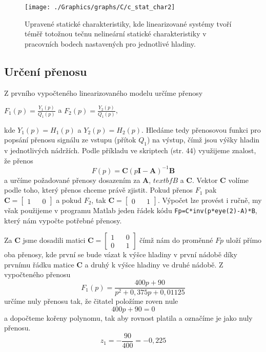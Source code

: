 \documentclass{article}
\begin{document}
			\begin{figure}[H]
				\centering
				\texttt{[image: ./Graphics/graphs/C/c\_stat\_char2]}
				\caption{Upravené statické charakteristiky, kde linearizované systémy tvoří téměř totožnou tečnu nelineární statické charakteristiky v pracovních bodech nastavených pro jednotlivé hladiny.}
				\label{pic:c_stat_char2}
			\end{figure}
				
			
		\subsection{Určení přenosu}
			Z prvního vypočteného linearizovaného modelu určíme přenosy
				\begin{center}
					$ F_{1}(p)=\frac{Y_{1}(p)}{Q_{1}(p)} $ \hspace{1cm} a \hspace{1cm} $ F_{2}(p)=\frac{Y_{2}(p)}{Q_{1}(p)} $,
				\end{center}
			kde \(Y_{1}(p) = H_{1}(p)\) a \(Y_{2}(p) = H_{2}(p)\). Hledáme tedy přenosovou funkci pro popsání přenosu signálu ze vstupu (přítok \(Q_{1}\)) na výstup, čímž jsou výšky hladin v jednotlivých nádržích.
			Podle příkladu ve skriptech (str. 44) využijeme znalost, že přenos 
			\[F(p)=\textbf{C}(p \textbf{I}-\textbf{A})^{-1}\textbf{B}\]
			a určíme požadované přenosy dosazením za \(\textbf{A}\), \(textbf{B}\) a \(\textbf{C}\). Vektor \(\textbf{C}\) volíme podle toho, který přenos chceme právě zjistit. Pokud přenos \(F_{1}\) pak \(\textbf{C}=\begin{bmatrix}1&&0\end{bmatrix}\) a pokud \(F_{2}\), tak \(\textbf{C}=\begin{bmatrix}0&&1\end{bmatrix}\). Výpočet lze provést i ručně, my však použijeme v programu Matlab jeden řádek kódu \verb|Fp=C*inv(p*eye(2)-A)*B|, který nám vypočte potřebné přenosy.
			
			 Za \(\textbf{C}\) jsme dosadili matici \(\textbf{C}=\begin{bmatrix}1&&0\\0&&1\end{bmatrix}\) čímž nám do proměnné \(Fp\) uloží přímo oba přenosy, kde první se bude vázat k výšce hladiny v první nádobě díky prvnímu řádku matice \(\textbf{C}\) a druhý k výšce hladiny ve druhé nádobě. Z vypočteného přenosu
			\[F_{1}(p)=\frac{400 p + 90}{p^2 + 0,375 p + 0,01125}\]
			určíme nuly přenosu tak, že čitatel položíme roven nule
			\[400p + 90=0\]
			a dopočteme kořeny polynomu, tak aby rovnost platila a označíme je jako nuly přenosu.
			\[z_{1}=-\frac{90}{400}=-0,225\]
			
\end{document}
